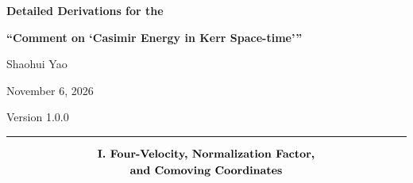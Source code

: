 \documentclass[english]{article}
\begin{document}
\vspace*{10mm}
\begin{center}
{\huge\textbf{Detailed Derivations for the}}{\huge\par}
\par\end{center}

\begin{center}
{\LARGE\textbf{``Comment on `Casimir Energy in Kerr Space-time'\thinspace{}''}}{\LARGE\par}
\par\end{center}

\begin{center}
{\Large Shaohui Yao}{\Large\par}
\par\end{center}

\begin{center}
{\large November 6, 2026}{\large\par}
\par\end{center}

\begin{center}
{\large Version 1.0.0}{\large\par}
\par\end{center}

\begin{center}\rule{55mm}{0.4pt}\end{center}\vspace{4mm}

\begin{center}\begin{minipage}{\linewidth}\fontsize{11}{14}\selectfont\tableofcontents\end{minipage}\end{center}\clearpage

\Needspace{110pt}\par\addvspace{20pt}\noindent\begin{minipage}{\linewidth}\begingroup\fontsize{12}{15}\selectfont\setlength{\abovedisplayskip}{0pt}\setlength{\belowdisplayskip}{0pt}\setlength{\abovedisplayshortskip}{0pt}\setlength{\belowdisplayshortskip}{0pt}
\[
\begin{gathered}\text{\bfseries I. Four-Velocity, Normalization Factor,}\\
\text{\bfseries and Comoving Coordinates}
\end{gathered}
\]
\endgroup\end{minipage}\par\nopagebreak[4]\vspace{20pt}\nopagebreak[4]
\end{document}
